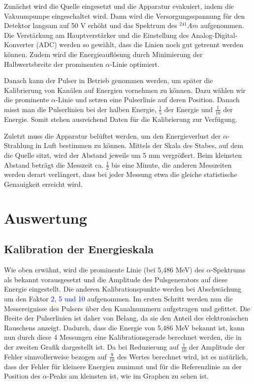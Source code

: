 \documentclass[bigchapter,colorback,accentcolor=tud4b,linedtoc,11pt]{tudreport}
\begin{document}
Zunächst wird die Quelle eingesetzt und die Apparatur evakuiert, indem die Vakuumpumpe eingeschaltet wird. Dann wird die Versorgungsspannung für den Detektor langsam auf 50 V erhöht und das Spektrum des $^{241}Am$ aufgenommen. Die Verstärkung am Hauptverstärker und die Einstellung des Analog-Digital-Konverter (ADC) werden so gewählt, dass die Linien noch gut getrennt werden können. Zudem wird die Energieauflösung durch Minimierung der Halbwertsbreite der prominenten $\alpha$-Linie optimiert. 

Danach kann der Pulser in Betrieb genommen werden, um später die Kalibrierung von Kanälen auf Energien vornehmen zu können. Dazu wählen wir die prominente $\alpha$-Linie und setzen eine Pulserlinie auf deren Position. Danach misst man die Pulserlinien bei der halben Energie, $\frac{1}{5}$ der Energie und $\frac{1}{10}$ der Energie. Somit stehen ausreichend Daten für die Kalibrierung zur Verfügung. 

Zuletzt muss die Apparatur belüftet werden, um den Energieverlust der $\alpha$-Strahlung in Luft bestimmen zu können. Mittels der Skala des Stabes, auf dem die Quelle sitzt, wird der Abstand jeweils um 5 mm vergrößert. Beim kleinsten Abstand beträgt die Messzeit ca. $\frac{1}{2}$ bis eine Minute, die anderen Messzeiten werden derart verlängert, dass bei jeder Messung etwa die gleiche statistische Genauigkeit erreicht wird. 

\chapter{Auswertung}

\section{Kalibration der Energieskala}

Wie oben erwähnt, wird die prominente Linie (bei 5,486 MeV) des
$\alpha$-Spektrums als bekannt vorausgesetzt und die Amplitude des Pulsgenerators
auf diese Energie eingestellt. Die anderen Kalibrationspunkte werden bei
Abschwächung um den Faktor \textcolor{blue}{2, 5 und 10} aufgenommen. Im ersten Schritt werden nun die
Messereignisse des Pulsers über den Kanalnummern aufgetragen und gefittet. Die
Breite der Pulserlinien ist daher von Belang, da sie den Anteil des
elektronischen Rauschens anzeigt. Dadurch, dass die Energie von 5,486 MeV
bekannt ist, kann nun durch diese 4 Messungen eine Kalibrationsgerade berechnet
werden, die in der zweiten Grafik dargestellt ist. Da bei Reduzierung auf
$\frac{1}{10}$ der Amplitude der Fehler sinnvollerweise bezogen auf
$\frac{9}{10}$ des Wertes berechnet wird, ist es natürlich, dass der Fehler für
kleinere Energien zunimmt und für die Referenzlinie an der Position des $\alpha$-Peaks am kleinsten ist, wie im Graphen zu sehen ist. 
\end{document}
